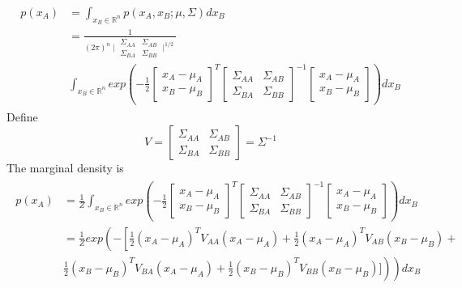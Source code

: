 \documentclass[12pt]{article}
\begin{document}
	\begin{equation}
	\begin{aligned}
	\begin{split}
		p(x_A)&=\int_{x_B\in \mathbb{R}^n}p(x_A,x_B;\mu,\varSigma)dx_B\\
		&=\frac{1}{(2\pi)^n\mid
		\begin{array}{cc}
			\varSigma_{AA} & \varSigma_{AB}\\
			\varSigma_{BA} & \varSigma_{BB}
		\end{array}
		\mid^{1/2}
		}\\&
		\int_{x_B\in \mathbb{R}^n}exp(
		-\frac{1}{2}
		\left[
		\begin{array}{c}
			x_A-\mu_A\\
			x_B-\mu_B
		\end{array}
		\right]^T
		\left[
		\begin{array}{cc}
			\varSigma_{AA} & \varSigma_{AB}\\
			\varSigma_{BA} & \varSigma_{BB}
		\end{array}
		\right]^{-1}
		\left[
		\begin{array}{c}
			x_A-\mu_A\\
			x_B-\mu_B
		\end{array}
		\right]
		)dx_B
	\end{split}
	\end{aligned}
	\end{equation}
	\noindent
	Define
	\begin{equation}
		V=\left[
		\begin{array}{cc}
			\varSigma_{AA} & \varSigma_{AB}\\
			\varSigma_{BA} & \varSigma_{BB}
		\end{array}
		\right]=\varSigma^{-1}
	\end{equation}
	\noindent
	The marginal density is
	\begin{equation}
	\begin{aligned}
	\begin{split}
	p(x_A)&=\frac{1}{Z}
	\int_{x_B\in \mathbb{R}^n}exp(
	-\frac{1}{2}
	\left[
	\begin{array}{c}
	x_A-\mu_A\\
	x_B-\mu_B
	\end{array}
	\right]^T
	\left[
	\begin{array}{cc}
	\varSigma_{AA} & \varSigma_{AB}\\
	\varSigma_{BA} & \varSigma_{BB}
	\end{array}
	\right]^{-1}
	\left[
	\begin{array}{c}
	x_A-\mu_A\\
	x_B-\mu_B
	\end{array}
	\right]
	)dx_B\\
	&=\frac{1}{Z}exp\left(-\left[\frac{1}{2}(x_A-\mu_A)^TV_{AA}(x_A-\mu_A)+\frac{1}{2}(x_A-\mu_A)^TV_{AB}(x_B-\mu_B)+\right.\right.\\
	&\left.\left.\frac{1}{2}(x_B-\mu_B)^TV_{BA}(x_A-\mu_A)+\frac{1}{2}(x_B-\mu_B)^TV_{BB}(x_B-\mu_B)]\right)\right)dx_B
	\end{split}
	\end{aligned}
	\end{equation}
	
	
	
	
	
\end{document}
